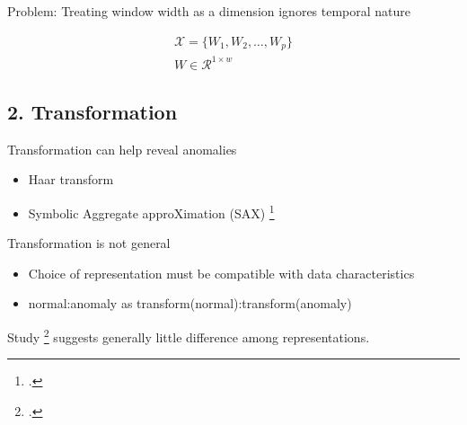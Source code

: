 \documentclass{beamer}
\begin{document}
  \begin{frame}{Problem: Treating window width as a dimension ignores temporal nature}

    \begin{gather*}
      \mathcal{X} =\{W_1,W_2,\ldots,W_p\}   \\
      W \in \mathcal{R}^{1 \times w}
    \end{gather*}
    
  \end{frame}






  \subsection{2. Transformation}


  \begin{frame}{Transformation can help reveal anomalies}

    \begin{itemize}
    \item Haar transform %
    \item Symbolic Aggregate approXimation (SAX) \footcite{Lin2007}
    \end{itemize}

  \end{frame}

  \begin{frame}{Transformation is not general}

    \begin{itemize}
    \item Choice of representation must be compatible with data characteristics  %
    \item normal:anomaly as transform(normal):transform(anomaly)
    \end{itemize}

    Study \footcite{Wang2013} suggests generally little difference among representations.

  \end{frame}
\end{document}
